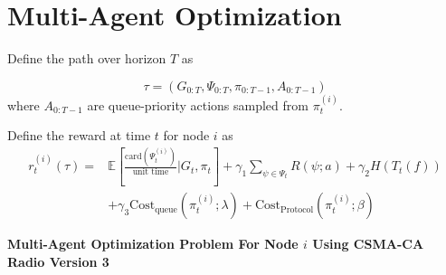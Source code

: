 \documentclass{article}
\begin{document}
\newpage

\section{Multi-Agent Optimization}Define the path over horizon $T$ as

$$
\tau = (G_{0:T}, \Psi_{0:T}, \pi_{0:T-1}, A_{0:T-1})
$$
where $A_{0:T-1}$ are queue-priority actions sampled from $\pi_{t}^{(i)}$.

Define the reward at time $t$ for node $i$ as
\begin{align*}
    r_{t}^{(i)} (\tau) = &\mathbb{E}[\frac{\text{card}(\Psi_{t}^{(i)})}{\text{unit time}} | G_{t}, \pi_{t}] + \gamma_{1} \sum_{\psi \in \Psi_{t}} R(\psi; a) +
            \gamma_{2} H(T_{t}(f)) \\
            &+ \gamma_{3} \text{Cost}_{\text{queue}}(\pi_{t}^{(i)}; \lambda) + \text{Cost}_{\text{Protocol}}(\pi_{t}^{(i)};\beta)
\end{align*}\nonumber

\noindent \textbf{Multi-Agent Optimization Problem For Node $i$ Using CSMA-CA Radio Version 3}
\\
\noindent{}

\vspace{1 cm}
\end{document}
